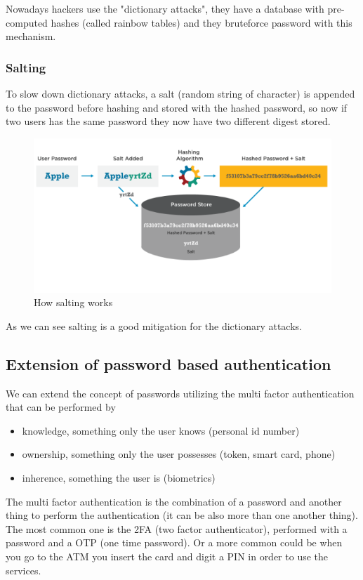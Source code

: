     Nowadays hackers use the "dictionary attacks", they have a database with pre-computed hashes (called rainbow tables) and they bruteforce password with this mechanism.
    
    \subsubsection{Salting}
    To slow down dictionary attacks, a salt (random string of character) is appended to the password before hashing and stored with the hashed password, so now if two users has the same password they now have two different digest stored.
    
    \begin{figure}[h!]
        \centering
        \includegraphics[scale=0.5]{images/prova.png}
        \caption{How salting works}
        \label{fig:salt}
    \end{figure}
    
    \FloatBarrier   
    
    As we can see salting is a good mitigation for the dictionary attacks.
    
    \subsection{Extension of password based authentication}
    We can extend the concept of passwords utilizing the multi factor authentication that can be performed by
    \begin{itemize}
        \item knowledge, something only the user knows (personal id number)
        \item ownership, something only the user possesses (token, smart card, phone)
        \item inherence, something the user is (biometrics)
    \end{itemize}
    The multi factor authentication is the combination of a password and another thing to perform the authentication (it can be also more than one another thing). The most common one is the 2FA (two factor authenticator), performed with a password and a OTP (one time password). Or a more common could be when you go to the ATM you insert the card and digit a PIN in order to use the services.
    
